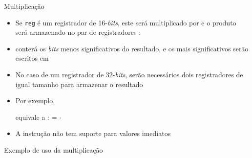 \begin{frame}[fragile]{Multiplicação}

    \begin{itemize}
        \item Se \texttt{reg} é um registrador de 16-\textit{bits}, este será multiplicado por
             e o produto será armazenado no par de registradores 
            :

        \item {} conterá os \textit{bits} menos significativos do resultado, e 
            os mais significativos serão escritos em 

        \item No caso de um registrador de 32-\textit{bits}, serão necessários dois registradores
            de igual tamanho para armazenar o resultado

        \item Por exemplo,


        equivale a : = $\cdot$

        \item A instrução  não tem suporte para valores imediatos
    \end{itemize}
\end{frame}

\begin{frame}[fragile]{Exemplo de uso da multiplicação}
\end{frame}

